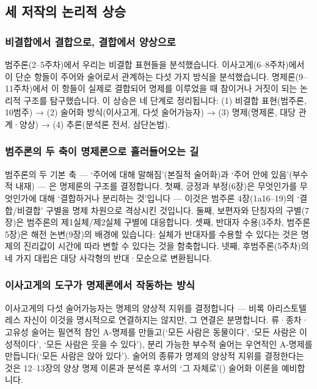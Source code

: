 \documentclass[12pt, a4paper]{article}
\begin{document}
\thispagestyle{firstpage}


\subsection{세 저작의 논리적 상승}

\subsubsection{비결합에서 결합으로, 결합에서 양상으로}

범주론(2--5주차)에서 우리는 비결합 표현들을 분석했습니다. 이사고게(6--8주차)에서 이 단순 항들이 주어와 술어로서 관계하는 다섯 가지 방식을 분석했습니다. 명제론(9--11주차)에서 이 항들이 실제로 결합되어 명제를 이루었을 때 참이거나 거짓이 되는 논리적 구조를 탐구했습니다. 이 상승은 네 단계로 정리됩니다: (1) 비결합 표현(범주론, 10범주) → (2) 술어화 방식(이사고게, 다섯 술어가능자) → (3) 명제(명제론, 대당 관계·양상) → (4) 추론(분석론 전서, 삼단논법).

\subsubsection{범주론의 두 축이 명제론으로 흘러들어오는 길}

범주론의 두 기본 축 --- `주어에 대해 말해짐'(본질적 술어화)과 `주어 안에 있음'(부수적 내재) --- 은 명제론의 구조를 결정합니다. 첫째, 긍정과 부정(6장)은 무엇인가를 무엇인가에 대해 `결합하거나 분리하는 것'입니다 --- 이것은 범주론 4장(1a16--19)의 `결합/비결합' 구별을 명제 차원으로 격상시킨 것입니다. 둘째, 보편자와 단칭자의 구별(7장)은 범주론의 제1실체/제2실체 구별에 대응합니다. 셋째, 반대자 수용(3주차, 범주론 5장)은 해전 논변(9장)의 배경에 있습니다: 실체가 반대자를 수용할 수 있다는 것은 명제의 진리값이 시간에 따라 변할 수 있다는 것을 함축합니다. 넷째, 후범주론(5주차)의 네 가지 대립은 대당 사각형의 반대·모순으로 변환됩니다.

\subsubsection{이사고게의 도구가 명제론에서 작동하는 방식}

이사고게의 다섯 술어가능자는 명제의 양상적 지위를 결정합니다 --- 비록 아리스토텔레스 자신이 이것을 명시적으로 연결하지는 않지만, 그 연결은 분명합니다. 류·종차·고유성 술어는 필연적 참인 A-명제를 만들고(`모든 사람은 동물이다', `모든 사람은 이성적이다', `모든 사람은 웃을 수 있다'), 분리 가능한 부수적 술어는 우연적인 A-명제를 만듭니다(`모든 사람은 앉아 있다'). 술어의 종류가 명제의 양상적 지위를 결정한다는 것은 12--13장의 양상 명제 이론과 분석론 후서의 `그 자체로'() 술어화 이론을 예비합니다.
\end{document}
